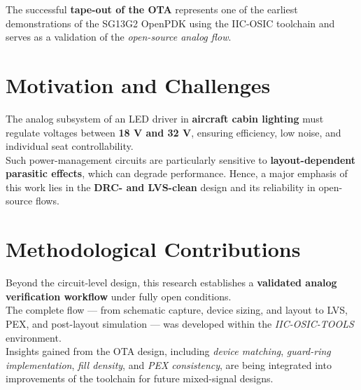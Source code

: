 \documentclass[
  11pt,
  a4paper,
  oneside]{scrbook}
\begin{document}
\begin{tcolorbox}[enhanced jigsaw, opacityback=0, breakable, colback=white, left=2mm, toprule=.15mm, arc=.35mm, coltitle=black, leftrule=.75mm, colbacktitle=quarto-callout-important-color!10!white, rightrule=.15mm, colframe=quarto-callout-important-color-frame, titlerule=0mm, title=\textcolor{quarto-callout-important-color}{\faExclamation}\hspace{0.5em}{Technical Milestone}, toptitle=1mm, bottomtitle=1mm, bottomrule=.15mm, opacitybacktitle=0.6]

The successful \textbf{tape-out of the OTA} represents one of the
earliest demonstrations of the SG13G2 OpenPDK using the IIC-OSIC
toolchain and serves as a validation of the \emph{open-source analog
flow}.

\end{tcolorbox}

\section{Motivation and Challenges}\label{motivation-and-challenges}

The analog subsystem of an LED driver in \textbf{aircraft cabin
lighting} must regulate voltages between \textbf{18 V and 32 V},
ensuring efficiency, low noise, and individual seat controllability.\\
Such power-management circuits are particularly sensitive to
\textbf{layout-dependent parasitic effects}, which can degrade
performance. Hence, a major emphasis of this work lies in the
\textbf{DRC- and LVS-clean} design and its reliability in open-source
flows.

\section{Methodological
Contributions}\label{methodological-contributions}

Beyond the circuit-level design, this research establishes a
\textbf{validated analog verification workflow} under fully open
conditions.\\
The complete flow --- from schematic capture, device sizing, and layout
to LVS, PEX, and post-layout simulation --- was developed within the
\emph{IIC-OSIC-TOOLS} environment.\\
Insights gained from the OTA design, including \emph{device matching},
\emph{guard-ring implementation}, \emph{fill density}, and \emph{PEX
consistency}, are being integrated into improvements of the toolchain
for future mixed-signal designs.
\end{document}
